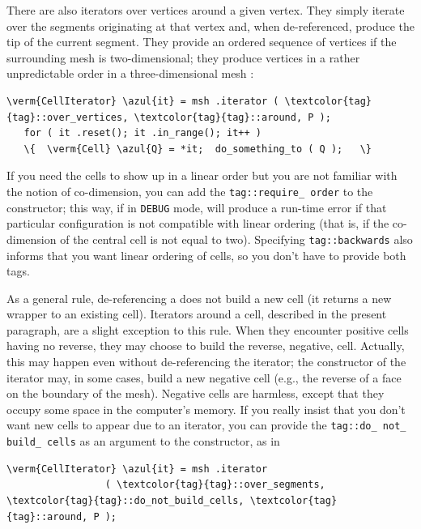 There are also iterators over vertices around a given vertex.
They simply iterate over the segments originating at that vertex and,
when de-referenced, produce the tip of the current segment.
They provide an ordered sequence of vertices if the surrounding mesh is two-dimensional;
they produce vertices in a rather unpredictable order in a three-dimensional mesh :

\begin{Verbatim}[commandchars=\\\{\},formatcom=\small\tt,
   baselinestretch=0.94,framesep=2mm                      ]
   \verm{CellIterator} \azul{it} = msh .iterator ( \textcolor{tag}{tag}::over_vertices, \textcolor{tag}{tag}::around, P );
   for ( it .reset(); it .in_range(); it++ )
   \{  \verm{Cell} \azul{Q} = *it;  do_something_to ( Q );   \}
\end{Verbatim}

If you need the cells to show up in a linear order but you are not familiar
with the notion of co-dimension, you can add the {\small\tt\textcolor{tag}{tag}::require\_\,order}
to the {\small\tt{}} constructor;
this way, if in {\small\tt DEBUG} mode, {\maniFEM} will produce a run-time error
if that particular configuration is not compatible with linear ordering
(that is, if the co-dimension of the central cell is not equal to two).
Specifying {\small\tt\textcolor{tag}{tag}::backwards} also informs {\maniFEM} that you want
linear ordering of cells, so you don't have to provide both tags.

As a general rule, de-referencing a {\small\tt{}} does not build a new
cell (it returns a new wrapper to an existing cell).
Iterators around a cell, described in the present paragraph, are a slight exception to this
rule.
When they encounter positive cells having no reverse, they may choose to build the reverse,
negative, cell.
Actually, this may happen even without de-referencing the iterator;
the constructor of the iterator may, in some cases, build a new negative cell
(e.g., the reverse of a face on the boundary of the mesh).
Negative cells are harmless, except that they occupy some space in the computer's memory.
If you really insist that you don't want new cells to appear due to an iterator,
you can provide the {\small\tt\textcolor{tag}{tag}::do\_\,not\_\,build\_\,cells} as an argument
to the constructor, as in

\begin{Verbatim}[commandchars=\\\{\},formatcom=\small\tt,
   baselinestretch=0.94,framesep=2mm                      ]
   \verm{CellIterator} \azul{it} = msh .iterator
                 ( \textcolor{tag}{tag}::over_segments, \textcolor{tag}{tag}::do_not_build_cells, \textcolor{tag}{tag}::around, P );
\end{Verbatim}


